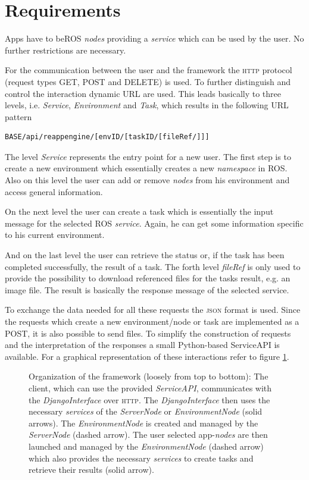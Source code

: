 \documentclass[10pt,a4paper]{article}
\begin{document}
	\section*{Requirements}
		Apps have to be\textsc{ROS} \emph{nodes} providing a
		\emph{service} which can be used by the user. No further restrictions are
		necessary.
		
		For the communication between the user and the framework the \textsc{http} protocol (request types \textsc{GET}, \textsc{POST} and \textsc{DELETE}) is used.
		To further
		distinguish and control the interaction dynamic URL are used. This leads basically to
		three levels, i.e. \emph{Service}, \emph{Environment} and \emph{Task}, which results in the
		following URL pattern
		\begin{lstlisting}
BASE/api/reappengine/[envID/[taskID/[fileRef/]]]
		\end{lstlisting}
		The level \emph{Service} represents the entry point for a new user. The first step is to
		create a new environment which essentially creates a new \emph{namespace} in \textsc{ROS}.
		Also on this level the user can add or remove \emph{nodes} from his environment and access general information.
		
		On the next level the user can create a task which is essentially the input message for
		the selected \textsc{ROS} \emph{service}. Again, he can get some information specific to
		his current environment.
		
		And on the last level the user can retrieve the status or, if the task has been completed
		successfully, the result of a task. The forth level \emph{fileRef} is only used to provide
		the possibility to download referenced files for the tasks result, e.g. an image file. The
		result is basically the response message of the selected service.
		
		To exchange the data needed for all these requests the \textsc{json} format is used. Since
		the requests which create a new environment/node or task are implemented as a
		\textsc{POST}, it is also possible to send files. To simplify the construction of requests and
		the interpretation of the responses a small Python-based ServiceAPI is available. For a graphical
		representation of these interactions refer to figure \ref{fig:diagram}. 
		
		\begin{figure}
			\begin{center}
				\def\svgwidth{\columnwidth}
				
				\caption{Organization of the framework (loosely from top to bottom): The client,
				which can use the provided \emph{ServiceAPI}, communicates with the
				\emph{DjangoInterface} over \textsc{http}. The \emph{DjangoInterface} then uses the
				necessary \emph{services} of the \emph{ServerNode} or \emph{EnvironmentNode} (solid
				arrows). The \emph{EnvironmentNode} is created and managed by the \emph{ServerNode}
				(dashed arrow). The user selected app-\emph{nodes} are then launched and managed by
				the \emph{EnvironmentNode} (dashed arrow) which also provides the necessary
				\emph{services} to create tasks and retrieve their results (solid arrow).}
				\label{fig:diagram}
			\end{center}
		\end{figure}
\end{document}
